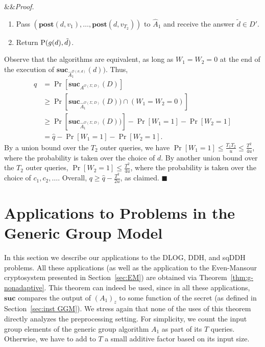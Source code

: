 \documentclass[11pt]{article}
\renewenvironment{proof}[1][]
    {\noindent
       \ifx&#1&{\it Proof.}
       \else{\it Proof ({#1}).}
       \fi}{\hfill $\blacksquare$}
\newcommand{\secv}{{d}}
\newcommand{\SECV}{{D}}
\newcommand{\calO}{\mathcal{O}}
\newcommand{\SUC}{\boldsymbol{suc}}
\newcommand{\POST}{\boldsymbol{post}}
\newcommand{\OUTP}{O}
\begin{document}
\begin{proof}
\begin{enumerate}
\begin{enumerate}
{            Continue to $m_{i+1}$.}
            \item If $u_i = u_j$ for some $j < i$, set $v_i \leftarrow v_j$. 
            Otherwise, sample $v_i \sim [N]\setminus \{v_1,\dots,v_{i-1}\}$ uniformly.
            \item \underline{If $v_i \in \OUTP$, 
            re-sample $v_i \sim [N]\setminus (\OUTP \cup \{v_1,\dots,v_{i-1}\})$ uniformly, and set $W_2 \leftarrow 1$.}       
        \end{enumerate}
        \item Pass $(\POST(\secv,v_1),\dots,\POST(\secv,v_{T_2}))$ to $\widehat{A}_1$ and receive the answer 
        $\tilde{\secv} \in \SECV'$.
        \item Return $\textup{P}(g(\secv),\tilde{\secv})$.
    \end{enumerate}
    Observe that the algorithms are equivalent, as long as $W_1 = W_2 = 0$ at the end of the execution of $\SUC_{\widehat{A}_1^{ \mathcal{\calO}(\sigma,\secv)} }(\secv))$.
    Thus, 
    \begin{align*}
    q 
    & = \Pr[\SUC_{A^{ \mathcal{\calO}(\Sigma,\SECV)} }(\SECV)] \\
    & \geq \Pr[ \SUC_{\widehat{A}_1^{ \mathcal{\calO}(\Sigma,\SECV)} }(\SECV)) \cap (W_1 = W_2 = 0)]  \\
    & \geq \Pr[ \SUC_{\widehat{A}_1^{ \mathcal{\calO}(\Sigma,\SECV)} }(\SECV)) ] - \Pr[W_1 = 1] - \Pr[W_2 = 1] \\
    & = \widehat{q} - \Pr[W_1 = 1] - \Pr[W_2 = 1].
    \end{align*}
    By a union bound over the $T_2$ outer queries, we have $\Pr[W_1 = 1] \leq \frac{T_1 T_2}{u} \le \frac{T^2}{4u}$, where the probability is taken over the choice of 
    $d$. By another union bound over the $T_2$ outer queries, $\Pr[W_2 = 1] \leq \frac{T^2}{4u}$, 
    where the probability is taken over the choice of $c_1,c_2,\ldots$.
    Overall, $q \ge \widehat{q} - \frac{T^2}{2u}$, as claimed.
\end{proof}

\section{Applications to Problems in the Generic Group Model}
\label{sec:DLOG}

In this section we describe our applications to the DLOG, DDH, and sqDDH problems. All these applications (as well as the application to the Even-Mansour cryptosystem presented in Section~\ref{sec:EM}) are obtained via Theorem~\ref{thm:g-nonadaptive}.
This theorem can indeed be used, since in all these applications, $\SUC$ compares the output of $(A_1)_z$ to some function of the secret
(as defined in Section~\ref{sec:inst GGM}).
We stress again that none of the uses of this theorem directly analyzes the preprocessing setting. 
For simplicity, we count the input group elements of the generic group algorithm $A_1$ as part of its $T$ queries. Otherwise, we have to add to $T$ a small additive factor based on its input size.
\end{document}
